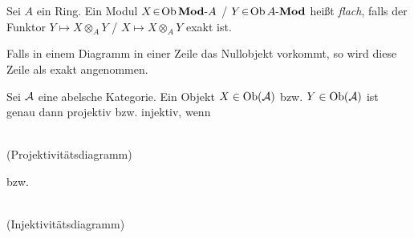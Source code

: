 \documentclass{cheat-sheet}
\begin{document}
\begin{defn}
  Sei $A$ ein Ring. Ein Modul $X \!\in\! \operatorname{Ob} \mathbf{Mod}\text{-}{A}$ / $Y \!\in\! \operatorname{Ob} {A}\text{-}\mathbf{Mod}$
  heißt \emph{flach}, falls der Funktor $Y \mapsto X \otimes_A Y$ / $X \mapsto X \otimes_A Y$ exakt ist.
\end{defn}

\begin{konv}
  Falls in einem Diagramm in einer Zeile das Nullobjekt vorkommt, so wird diese Zeile als exakt angenommen.
\end{konv}

\begin{bem}
  Sei $\mathcal{A}$ eine abelsche Kategorie. Ein Objekt $X \in \operatorname{Ob}(\mathcal{A})$ bzw. $Y \in \operatorname{Ob}(\mathcal{A})$ ist genau dann projektiv bzw. injektiv, wenn
  \vspace{-10pt}
  \begin{center}
    \begin{minipage}{100pt}
      \begin{center}
         \\
        (Projektivitätsdiagramm)
      \end{center}
    \end{minipage}
    \hspace{8pt}
    \begin{minipage}[t]{10pt}
      \vspace{-10pt}
      bzw.
    \end{minipage}
    \hspace{12pt}
    \begin{minipage}{100pt}
      \begin{center}
         \\
        (Injektivitätsdiagramm)
      \end{center}
    \end{minipage}
  \end{center}
\end{bem}
\end{document}
